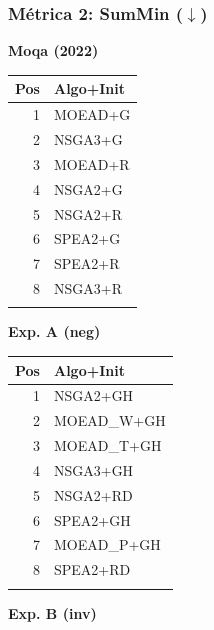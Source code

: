 \documentclass[a4paper,10pt]{article}
\begin{document}
\subsubsection{Métrica 2: SumMin \texorpdfstring{($\downarrow$)}{(down)}}
\begin{table}[H]
    \centering
    \begin{minipage}[t]{0.32\textwidth}
        \centering\scriptsize\textbf{Moqa (2022)}\\
        \begin{tabular}{rl}
            \toprule
            Pos & Algo+Init \\ \midrule
            1 & MOEAD+G \\
            2 & NSGA3+G \\
            3 & MOEAD+R \\
            4 & NSGA2+G \\
            5 & NSGA2+R \\
            6 & SPEA2+G \\
            7 & SPEA2+R \\
            8 & NSGA3+R \\
            \\
            \bottomrule
        \end{tabular}
    \end{minipage}
    \hfill
    \begin{minipage}[t]{0.32\textwidth}
        \centering\scriptsize\textbf{Exp. A (neg)}\\
        \begin{tabular}{rl}
            \toprule
            Pos & Algo+Init \\ \midrule
            1 & NSGA2+GH \\
            2 & MOEAD\_W+GH \\
            3 & MOEAD\_T+GH \\
            4 & NSGA3+GH \\
            5 & NSGA2+RD \\
            6 & SPEA2+GH \\
            7 & MOEAD\_P+GH \\
            8 & SPEA2+RD \\
            \\
            \bottomrule
        \end{tabular}
    \end{minipage}
    \hfill
    \begin{minipage}[t]{0.32\textwidth}
        \centering\scriptsize\textbf{Exp. B (inv)}\\

\end{minipage}
\end{table}
\end{document}
